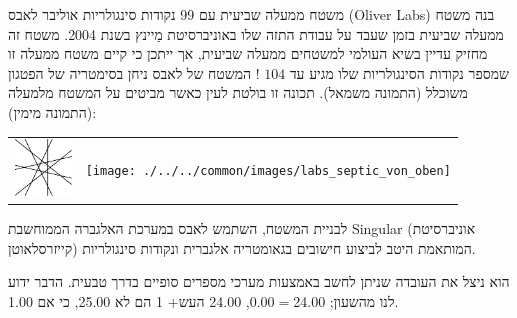 \begin{surferPage}{משטח ממעלה שביעית עם 99 נקודות סינגולריות}
    אוליבר לאבס (Oliver Labs) בנה משטח ממעלה שביעית בזמן שעבד על
    עבודת התזה שלו באוניברסיטת מַיינץ בשנת 2004. משטח זה מחזיק עדיין בשיא העולמי למשטחים ממעלה שביעית,
    אך ייתכן כי קיים משטח ממעלה זו שמספר נקודות הסינגולריות שלו מגיע עד $104$
    !  
    המשטח של לאבס ניחן בסימטריה של הפטגון משוכלל (התמונה משמאל).
    תכונה זו בולטת לעין כאשר מביטים על המשטח מלמעלה (התמונה מימין):

    \vspace*{-0.3em}
    \begin{center}
      \begin{tabular}{c@{\qquad}c}
        \includegraphics[height=1.5cm]{./../../common/images/labsseptic1.pdf}
        &
        \texttt{[image: ./../../common/images/labs\_septic\_von\_oben]}
      \end{tabular}
    \end{center}
    \vspace*{-0.3em}

    לבניית המשטח, השתמש לאבס במערכת האלגברה הממוחשבת
    {\sc Singular} (אוניברסיטת קייזרסלאוטן) המותאמת היטב
    לביצוע חישובים בגאומטריה אלגברית ונקודות סינגולריות.

    הוא ניצל את העובדה שניתן לחשב באמצעות מערכי מספרים סופיים
    בדרך טבעית. הדבר ידוע לנו מהשעון; 24.00$=$0.00, 24.00 $+ שעה $ 1 הם
    לא 25.00, כי אם 1.00.
\end{surferPage}
